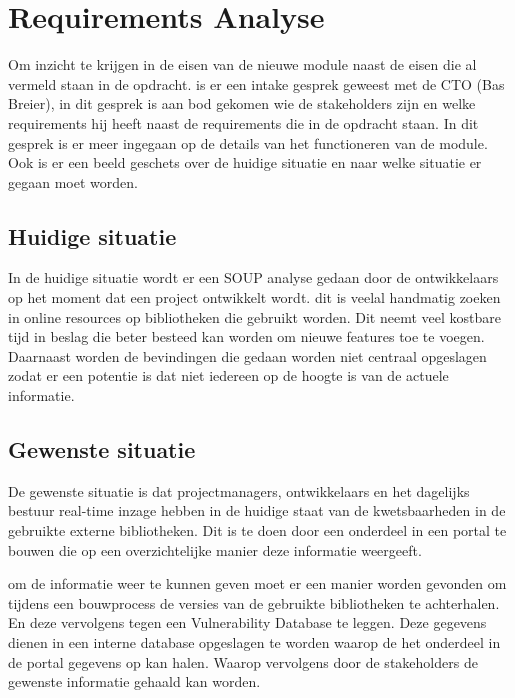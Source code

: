 
\chapter{Requirements Analyse} %

\label{requirementsAnalyse} %
Om inzicht te krijgen in de eisen van de nieuwe module naast de eisen die al vermeld staan in de opdracht. is er een intake gesprek geweest met de CTO (Bas Breier), in dit gesprek is aan bod gekomen wie de stakeholders zijn en welke requirements hij heeft naast de requirements die in de opdracht staan. In dit gesprek is er meer ingegaan op de details van het functioneren van de module. Ook is er een beeld geschets over de huidige situatie en naar welke situatie er gegaan moet worden. %


\section{Huidige situatie}
In de huidige situatie wordt er een SOUP analyse gedaan door de ontwikkelaars op het moment dat een project ontwikkelt wordt. dit is veelal handmatig zoeken in online resources op bibliotheken die gebruikt worden. Dit neemt veel kostbare tijd in beslag die beter besteed kan worden om nieuwe features toe te voegen. Daarnaast worden de bevindingen die gedaan worden niet centraal opgeslagen zodat er een potentie is dat niet iedereen op de hoogte is van de actuele informatie.

\section{Gewenste situatie}
De gewenste situatie is dat projectmanagers, ontwikkelaars en het dagelijks bestuur real-time inzage hebben in de huidige staat van de kwetsbaarheden in de gebruikte externe bibliotheken. Dit is te doen door een onderdeel in een portal te bouwen die op een overzichtelijke manier deze informatie weergeeft.

om de informatie weer te kunnen geven moet er een manier worden gevonden om tijdens een bouwprocess de versies van de gebruikte bibliotheken te achterhalen. En deze vervolgens tegen een Vulnerability Database te leggen. Deze gegevens dienen in een interne database opgeslagen te worden waarop de het onderdeel in de portal gegevens op kan halen. Waarop vervolgens door de stakeholders de gewenste informatie gehaald kan worden.

